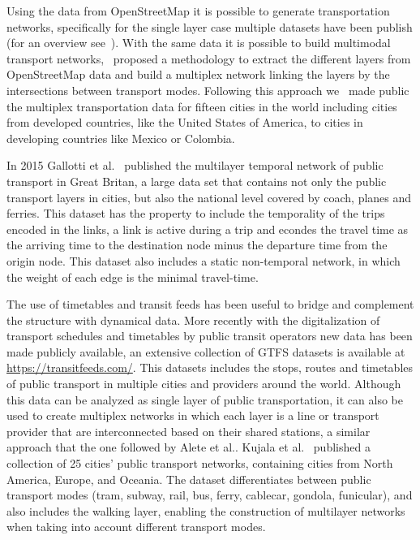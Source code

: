 Using the data from OpenStreetMap it is possible to generate transportation networks, specifically for the single layer case multiple datasets have been publish (for an overview see~\cite{boeing2020multiscale,boeing2020world}). With the same data it is possible to build multimodal transport networks,~\cite{gil2015building} proposed a methodology to extract the different layers from OpenStreetMap data and build a multiplex network linking the layers by the intersections between transport modes. Following this approach we~\cite{natera2019data} made public the multiplex transportation data for fifteen cities in the world including cities from developed countries, like the United States of America, to cities in developing countries like Mexico or Colombia.

In 2015 Gallotti et al.~\cite{gallotti2015temporal} published the multilayer temporal network of public transport in Great Britan, a large data set that contains not only the public transport layers in cities, but also the national level covered by coach, planes and ferries. This dataset has the property to include the temporality of the trips encoded in the links, a link is active during a trip and econdes the travel time as the arriving time to the destination node minus the departure time from the origin node. This dataset also includes a static non-temporal network, in which the weight of each edge is the minimal travel-time.

The use of timetables and transit feeds has been useful to bridge and complement the structure with dynamical data. More recently with the digitalization of transport schedules and timetables by public transit operators new data has been made publicly available, an extensive collection of GTFS datasets is available at \url{https://transitfeeds.com/}. This datasets includes the stops, routes and timetables of public transport in multiple cities and providers around the world. Although this data can be analyzed as single layer of public transportation, it can also be used to create multiplex networks in which each layer is a line or transport provider that are interconnected based on their shared stations, a similar approach that the one followed by Alete et al.\cite{Aleta2017Multilayer}. Kujala et al.~\cite{kujala2018collection} published a collection of 25 cities' public transport networks, containing cities from North America, Europe, and Oceania. The dataset differentiates between public transport modes (tram, subway, rail, bus, ferry, cablecar, gondola, funicular), and also includes the walking layer, enabling the construction of multilayer networks when taking into account different transport modes. 

